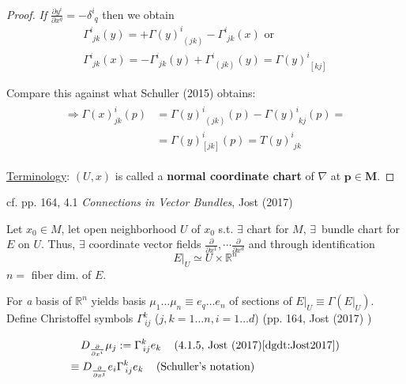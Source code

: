 \begin{proof}
\emph{If} $\frac{\partial y^i}{\partial x^q} = -\delta^i_{\, \, q}$ then we obtain 
\[
\begin{gathered}
	\Gamma^i_{\, \, jk} (y) = + \Gamma(y)^i_{\,\, (jk)} - \Gamma^i_{\,\, jk} (x) \text{ or  } \\
	\Gamma^i_{\, \, jk} (x) = - \Gamma^i_{\, \, jk} (y) + \Gamma^i_{\, \, (jk)} (y) = \Gamma(y)^i_{\, \, [kj]}
\end{gathered}
\]


Compare this against what Schuller (2015) \cite{dgdt:Schul2015} obtains:
	\[
	\begin{gathered}
		\begin{aligned} 
			\Longrightarrow \Gamma(x)^i_{jk}(p) & = \Gamma(y)^i_{\,\, (jk)}(p)  -  \Gamma(y)^i_{\,\, kj}(p) =  \\
			& = \Gamma(y)^i_{[jk]}(p) = T(y)^i_{\,\,jk}
		\end{aligned} 
	\end{gathered}
	\]
	
	\underline{Terminology}: $(U,x)$ is called a \textbf{normal coordinate chart} of $\nabla$ at {$\mathbf{p\in M}$}.
	
\end{proof}



cf. pp. 164, 4.1 \emph{Connections in Vector Bundles}, Jost (2017) \cite{dgdt:Jost2017}

Let $x_0 \in M$, let open neighborhood $U$ of $x_0$ s.t. $\exists$ chart for $M$, $\exists\,$ bundle chart for $E$ on $U$. Thus, $\exists$ coordinate vector fields $\frac{\partial }{ \partial x^1} , \cdots \frac{\partial }{ \partial x^d}$ and through identification
\[
\left. E \right|_U \simeq U \times \mathbb{R}^n
\]
$n = $ fiber dim. of $E$.

For \emph{a} basis of $\mathbb{R}^n$ yields basis $\mu_1 \dots \mu_n \equiv e_q \dots e_n$ of sections of $\left. E \right|_U \equiv \Gamma(\left. E \right|_U )$. Define Christoffel symbols $\Gamma^k_{\, ij}$ ($j,k =1\dots n, i =1 \dots d$) (pp. 164, Jost (2017) \cite{dgdt:Jost2017}) 

\begin{equation}
	\begin{aligned}
		D_{\frac{\partial}{\partial x^i} } \mu_j & := \Gamma^k_{\, ij} e_k \quad \, (\text{4.1.5, Jost (2017)\cite{dgdt:Jost2017}}) \\
		\equiv D_{\frac{\partial}{\partial x^j} } e_i & \Gamma^k_{\, ij} e_k \quad \, (\text{Schuller's notation})\\
	\end{aligned}
\end{equation}

